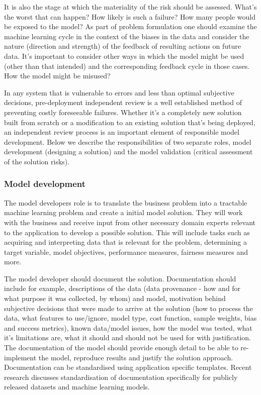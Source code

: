 It is also the stage at which the materiality of the risk should be assessed. What's the worst that can happen? How likely is such a failure? How many people would be exposed to the model? As part of problem formulation one should examine the machine learning cycle in the context of the biases in the data and consider the nature (direction and strength) of the feedback of resulting actions on future data. It's important to consider other ways in which the model might be used (other than that intended) and the corresponding feedback cycle in those cases. How the model might be misused?

In any system that is vulnerable to errors and less than optimal subjective decisions, pre-deployment independent review is a well established method of preventing costly foreseeable failures. Whether it's a completely new solution built from scratch or a modification to an existing solution that's being deployed, an independent review process is an important element of responsible model development. Below we describe the responsibilities of two separate roles, model development (designing a solution) and the model validation (critical assessment of the solution risks).

\subsubsection*{Model development}

The model developers role is to translate the business problem into a tractable machine learning problem and create a initial model solution. They will work with the business and receive input from other necessary domain experts relevant to the application to develop a possible solution. This will include tasks such as acquiring and interpreting data that is relevant for the problem, determining a target variable, model objectives, performance measures, fairness measures and more.

The model developer should document the solution. Documentation should include for example, descriptions of the data (data provenance - how and for what purpose it was collected, by whom) and model, motivation behind subjective decisions that were made to arrive at the solution (how to process the data, what features to use/ignore, model type, cost function, sample weights, bias and success metrics), known data/model issues, how the model was tested, what it's limitations are, what it should and should not be used for with justification. The documentation of the model should provide enough detail to be able to re-implement the model, reproduce results and justify the solution approach. Documentation can be standardised using application specific templates. Recent research discusses standardisation of documentation specifically for publicly released datasets\cite{DS4DS} and machine learning models\cite{MC4MR}.


